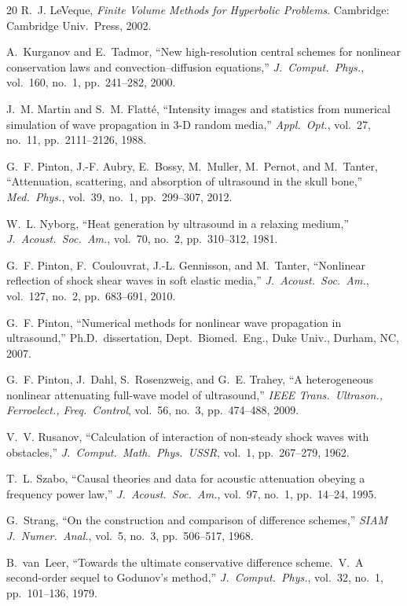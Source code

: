 \documentclass[11pt]{article}
\begin{document}
\begin{thebibliography}{20}
R.~J. LeVeque,
\textit{Finite Volume Methods for Hyperbolic Problems}.
Cambridge: Cambridge Univ.\ Press, 2002.

A.~Kurganov and E.~Tadmor,
``New high-resolution central schemes for nonlinear conservation laws
and convection--diffusion equations,''
\textit{J.\ Comput.\ Phys.}, vol.~160, no.~1, pp.~241--282, 2000.

J.~M. Martin and S.~M. Flatt\'{e},
``Intensity images and statistics from numerical simulation of wave
propagation in 3-D random media,''
\textit{Appl.\ Opt.}, vol.~27, no.~11, pp.~2111--2126, 1988.

G.~F. Pinton, J.-F. Aubry, E.~Bossy, M.~Muller, M.~Pernot, and M.~Tanter,
``Attenuation, scattering, and absorption of ultrasound in the skull bone,''
\textit{Med.\ Phys.}, vol.~39, no.~1, pp.~299--307, 2012.

W.~L. Nyborg,
``Heat generation by ultrasound in a relaxing medium,''
\textit{J.\ Acoust.\ Soc.\ Am.}, vol.~70, no.~2, pp.~310--312, 1981.

G.~F. Pinton, F.~Coulouvrat, J.-L. Gennisson, and M.~Tanter,
``Nonlinear reflection of shock shear waves in soft elastic media,''
\textit{J.\ Acoust.\ Soc.\ Am.}, vol.~127, no.~2, pp.~683--691, 2010.

G.~F. Pinton,
``Numerical methods for nonlinear wave propagation in ultrasound,''
Ph.D.\ dissertation, Dept.\ Biomed.\ Eng., Duke Univ., Durham, NC, 2007.

G.~F. Pinton, J.~Dahl, S.~Rosenzweig, and G.~E. Trahey,
``A heterogeneous nonlinear attenuating full-wave model of ultrasound,''
\textit{IEEE Trans.\ Ultrason., Ferroelect., Freq.\ Control},
vol.~56, no.~3, pp.~474--488, 2009.

V.~V. Rusanov,
``Calculation of interaction of non-steady shock waves with obstacles,''
\textit{J.\ Comput.\ Math.\ Phys.\ USSR}, vol.~1, pp.~267--279, 1962.

T.~L. Szabo,
``Causal theories and data for acoustic attenuation obeying a
frequency power law,''
\textit{J.\ Acoust.\ Soc.\ Am.}, vol.~97, no.~1, pp.~14--24, 1995.

G.~Strang,
``On the construction and comparison of difference schemes,''
\textit{SIAM J.\ Numer.\ Anal.}, vol.~5, no.~3, pp.~506--517, 1968.

B.~van~Leer,
``Towards the ultimate conservative difference scheme.~V.~A
second-order sequel to Godunov's method,''
\textit{J.\ Comput.\ Phys.}, vol.~32, no.~1, pp.~101--136, 1979.


\end{thebibliography}
\end{document}
